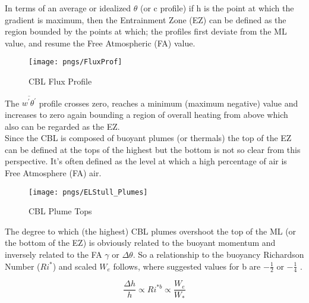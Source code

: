 In terms of an average or idealized $\theta$ (or c profile) if h is the point at which the gradient is maximum, then the Entrainment Zone (EZ)
can be defined as the region bounded by the points at which; the profiles first deviate from the ML value, and resume the Free Atmospheric (FA) value.\\
\newpage
\begin{wrapfigure}{r}{0.6\textwidth}
    \begin{center}
      \vspace{-12mm}
    \texttt{[image: pngs/FluxProf]}
    \vspace{-5mm}
    \end{center}
    \caption{CBL Flux Profile \cite{Stull-BLMetIntro}}
    \label{fig:CBLFluxProf}   %
\end{wrapfigure}

The $\overline{w^{'}\theta^{'}}$ profile crosses zero, reaches a minimum (maximum negative) value and increases to zero again bounding a region of overall heating from above which also can be regarded as the EZ.\\

Since the CBL is composed of buoyant plumes (or thermals) the top of the EZ can be defined at the tops of the highest but the bottom is not so clear from this perspective.  It's often defined as the level at which a high percentage of air is Free Atmosphere (FA) air. \cite{StullNelEl} \\

\begin{figure}[!ht]
    \centering
    \texttt{[image: pngs/ELStull\_Plumes]}
    \caption{CBL Plume Tops \cite{StullNelEl}}
    \label{fig:CBLPlumTops}   %
\end{figure}


The degree to which (the highest) CBL plumes overshoot the top of the ML (or the bottom of the EZ) is obviously related to the buoyant momentum and inversely related to the FA $\gamma$ or $\Delta \theta$.  So a relationship to the buoyancy Richardson Number ($Ri^{*}$) and scaled $W_{e}$ follows, where suggested values for b  are  $-\frac{1}{2}$ or $-\frac{1}{4}$ \cite{StullNelEl}.

\begin{equation}
\frac{\Delta h}{h} \propto Ri^{* b} \propto \frac{W_{e}}{W_{*}}  
\end{equation}  

